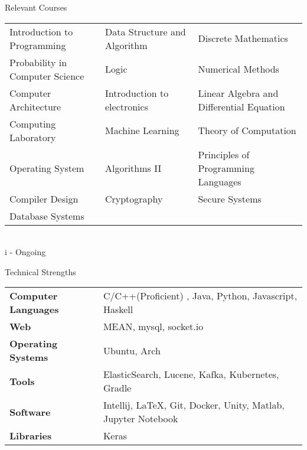 \documentclass{resume}
\newcommand{\tab}[1]{\hspace{6cm}\rlap{#1}}
\newcommand{\itab}[1]{\hspace{-0.1cm}\rlap{#1}}
\begin{document}
\begin{rSection}{Relevant Courses}
\begin{tabular}{ l l l }
 Introduction to Programming & Data Structure and Algorithm & Discrete Mathematics \\ 
 Probability in Computer Science & Logic & Numerical Methods\\  
 Computer Architecture & Introduction to electronics & Linear Algebra and Differential Equation\\
 Computing Laboratory & Machine Learning & Theory of Computation \\
 Operating System & Algorithms II  & Principles of Programming Languages\\
 Compiler Design & Cryptography  & Secure Systems \\
 Database Systems & &\\
\end{tabular}
\\ i  - Ongoing

\end{rSection}

\begin{rSection}{Technical Strengths}

\begin{tabular}{ @{} >{\bfseries}l @{\hspace{6ex}} l }
Computer Languages &   C/C++(Proficient) , Java, Python, Javascript, Haskell\\
Web & MEAN, mysql, socket.io\\
Operating Systems & Ubuntu, Arch\\
Tools & ElasticSearch, Lucene, Kafka, Kubernetes, Gradle \\
Software & Intellij, LaTeX, Git, Docker, Unity, Matlab, Jupyter Notebook \\
Libraries & Keras\\
\end{tabular}

\end{rSection}
\end{document}
